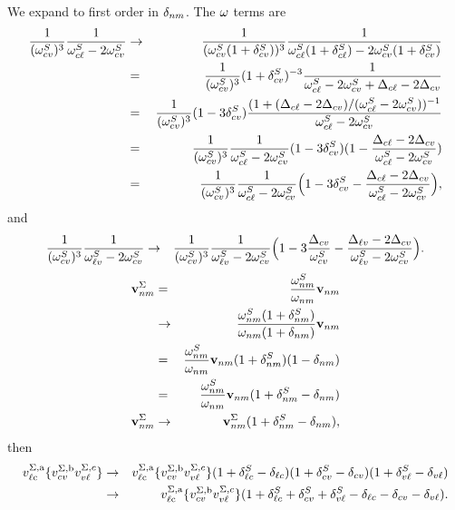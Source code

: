 \documentclass[floatfix,prb,aps,superscriptaddress,11pt]{revtex4}
\begin{document}
We expand to first order in $\delta_{nm}$. The $\omega$ terms are
\begin{eqnarray}\label{t1}
\frac{1}{(\omega_{cv}^{S})^{3}}\frac{
1
}{\omega
_{c\ell }^{S}-2\omega_{cv}^{S}}
&\to&
\frac{1}{(\omega_{cv}^{S}(1+\delta^S_{cv}))^{3}}\frac{
1
}{\omega_{c\ell }^{S}(1+\delta^S_{c\ell})-2\omega_{cv}^{S}(1+\delta^S_{cv})}
\nonumber\\
&=&
\frac{1}{(\omega_{cv}^{S})^3}(1+\delta^S_{cv})^{-3}\frac{1}
{\omega_{c\ell }^{S}-2\omega_{cv}^S+\Delta_{c\ell}-2\Delta_{cv}}
\nonumber\\
&=&
\frac{1}{(\omega_{cv}^{S})^3}(1-3\delta^S_{cv})
\frac{(1+(\Delta_{c\ell}-2\Delta_{cv})/(\omega_{c\ell }^{S}-2\omega_{cv}^S))^{-1}}
{\omega_{c\ell }^{S}-2\omega_{cv}^S}
\nonumber\\
&=&
\frac{1}{(\omega_{cv}^{S})^3}
\frac{1}{\omega_{c\ell }^{S}-2\omega_{cv}^S}
(1-3\delta^S_{cv})
(1-\frac{\Delta_{c\ell}-2\Delta_{cv}}{\omega_{c\ell }^{S}-2\omega_{cv}^S})
\nonumber\\
&=&
\frac{1}{(\omega_{cv}^{S})^3}
\frac{1}{\omega_{c\ell }^{S}-2\omega_{cv}^S}
\Big(1-3\delta^S_{cv}
-\frac{\Delta_{c\ell}-2\Delta_{cv}}{\omega_{c\ell }^{S}-2\omega_{cv}^S}\Big)
,
\end{eqnarray} 
and
\begin{eqnarray}\label{t1}
\frac{1}{(\omega_{cv}^{S})^{3}}\frac{
1
}{\omega
_{\ell v }^{S}-2\omega_{cv}^{S}}
&\to&
\frac{1}{(\omega_{cv}^{S})^3}
\frac{1}{\omega_{\ell v }^{S}-2\omega_{cv}^S}
\Big(1-3\frac{\Delta_{cv}}{\omega_{cv}^S}
-\frac{\Delta_{\ell v}-2\Delta_{cv}}{\omega_{\ell v }^{S}-2\omega_{cv}^S}\Big)
.
\end{eqnarray}
\begin{eqnarray}\label{t5}
\mathbf{v}^\Sigma_{nm}
&=&\frac{\omega_{nm}^S}{\omega_{nm}}\mathbf{v}_{nm}
\nonumber\\
&\to&
\frac{\omega_{nm}^S(1+\delta^S_{nm})}{\omega_{nm}(1+\delta_{nm})}\mathbf{v}_{nm}
\nonumber\\
&=&
\frac{\omega_{nm}^S}
{\omega_{nm}}\mathbf{v}_{nm}
(1+\delta^S_{nm})(1-\delta_{nm})
\nonumber\\
&=&
\frac{\omega_{nm}^S}
{\omega_{nm}}\mathbf{v}_{nm}
(1+\delta^S_{nm}-\delta_{nm})
\nonumber \\
\mathbf{v}^\Sigma_{nm}
&\to&
\mathbf{v}^\Sigma_{nm}
(1+\delta^S_{nm}-\delta_{nm})
,
\end{eqnarray}
then
\begin{eqnarray}\label{t.01}
v_{\ell \mathrm{c}}^{\Sigma ,\mathrm{a}}\{v_{cv}^{\Sigma ,\mathrm{b}}v_{v\ell }^{\Sigma ,c}\}
&\to&
v_{\ell \mathrm{c}}^{\Sigma ,\mathrm{a}}\{v_{cv}^{\Sigma ,\mathrm{b}}v_{v\ell }^{\Sigma ,c}\}
(1+\delta^S_{\ell c}-\delta_{\ell c})
(1+\delta^S_{cv}-\delta_{cv})
(1+\delta^S_{v\ell}-\delta_{v\ell})
\nonumber\\
&\to&
v_{\ell \mathrm{c}}^{\Sigma ,\mathrm{a}}\{v_{cv}^{\Sigma ,\mathrm{b}}v_{v\ell }^{\Sigma ,c}\}
(1+\delta^S_{\ell c}+\delta^S_{cv}+\delta^S_{v\ell}
-\delta_{\ell c}-\delta_{cv}-\delta_{v\ell})
.
\end{eqnarray}
\end{document}
